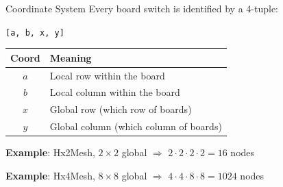 \documentclass[t]{beamer}
\begin{document}
\begin{frame}{Coordinate System}
    Every board switch is identified by a 4-tuple:
    \vspace{0.2cm}

    \centering
    \texttt{[a, b, x, y]}

    \vspace{0.2cm}

    \raggedright
    \begin{tabular}{cl}
        \toprule
        \textbf{Coord} & \textbf{Meaning} \\
        \midrule
        $a$ & Local row within the board \\
        $b$ & Local column within the board \\
        $x$ & Global row (which row of boards) \\
        $y$ & Global column (which column of boards) \\
        \bottomrule
    \end{tabular}

    \vspace{0.3cm}

    \textbf{Example}: Hx2Mesh, $2\times2$ global $\Rightarrow$ $2 \cdot 2 \cdot 2 \cdot 2 = 16$ nodes

    \textbf{Example}: Hx4Mesh, $8\times8$ global $\Rightarrow$ $4 \cdot 4 \cdot 8 \cdot 8 = 1024$ nodes
\end{frame}
\end{document}

